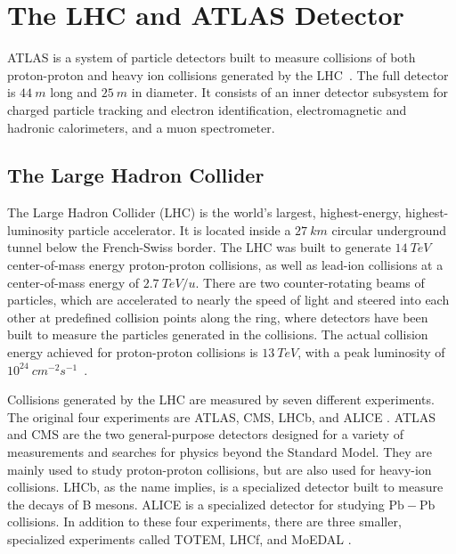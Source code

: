 \chapter{The LHC and ATLAS Detector}\label{ch:atlas}

ATLAS is a system of particle detectors built to measure collisions of both proton-proton and heavy ion collisions
generated by the LHC~\cite{atlas-detector-2008}.
The full detector is $44~m$ long and $25~m$ in diameter.
It consists of an inner detector subsystem for charged particle tracking and electron identification,
electromagnetic and hadronic calorimeters, and a muon spectrometer.

\section{The Large Hadron Collider}\label{sec:lhc}

The Large Hadron Collider (LHC) is the world's largest, highest-energy, highest-luminosity particle accelerator.
It is located inside a $27~km$ circular underground tunnel below the French-Swiss border.
The LHC was built to generate $14~TeV$ center-of-mass energy proton-proton collisions,
as well as lead-ion collisions at a center-of-mass energy of $2.7~TeV/u$.
There are two counter-rotating beams of particles,
which are accelerated to nearly the speed of light and steered into each other at predefined collision points along the
ring, where detectors have been built to measure the particles generated in the collisions.
The actual collision energy achieved for proton-proton collisions is $13~TeV$,
with a peak luminosity of $10^{24}~cm^{-2}s^{-1}$~\cite{lhc-guide-2017}.

Collisions generated by the LHC are measured by seven different experiments.
The original four experiments are ATLAS, CMS, LHCb, and ALICE .
ATLAS and CMS are the two general-purpose detectors designed for a variety of measurements and searches for physics
beyond the Standard Model.
They are mainly used to study proton-proton collisions, but are also used for heavy-ion collisions.
LHCb, as the name implies, is a specialized detector built to measure the decays of B mesons.
ALICE is a specialized detector for studying $\mathrm{Pb}-\mathrm{Pb}$ collisions.
In addition to these four experiments, there are three smaller, specialized experiments called TOTEM, LHCf, and MoEDAL .

